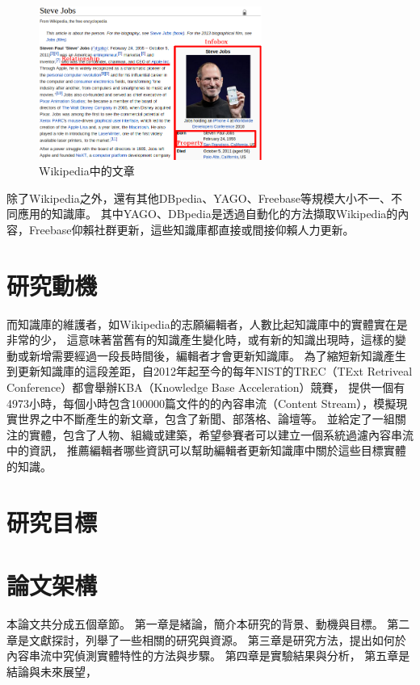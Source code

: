 \begin{figure}
\centering
\includegraphics[width=0.65\textwidth]{images/01-wiki-as-kb}
\caption{Wikipedia中的文章}
\label{i:wiki}
\end{figure}

除了Wikipedia之外，還有其他DBpedia\cite{dbpedia-swj}、YAGO\cite{suchanek2007WWW}、Freebase\cite{freebase}等規模大小不一、不同應用的知識庫。
其中YAGO、DBpedia是透過自動化的方法擷取Wikipedia的內容，Freebase仰賴社群更新，這些知識庫都直接或間接仰賴人力更新。

%
%
\section{研究動機}
而知識庫的維護者，如Wikipedia的志願編輯者，人數比起知識庫中的實體實在是非常的少，
這意味著當舊有的知識產生變化時，或有新的知識出現時，這樣的變動或新增需要經過一段長時間後，編輯者才會更新知識庫。
為了縮短新知識產生到更新知識庫的這段差距，自2012年起至今的每年NIST的TREC（TExt Retriveal Conference）都會舉辦KBA（Knowledge Base Acceleration）競賽，
提供一個有4973小時，每個小時包含100000篇文件的的內容串流（Content Stream），模擬現實世界之中不斷產生的新文章，包含了新聞、部落格、論壇等。
並給定了一組關注的實體，包含了人物、組織或建築，希望參賽者可以建立一個系統過濾內容串流中的資訊，
推薦編輯者哪些資訊可以幫助編輯者更新知識庫中關於這些目標實體的知識。




%
%
\section{研究目標}

%
%
\section{論文架構}  %
本論文共分成五個章節。
第一章是緒論，簡介本研究的背景、動機與目標。
第二章是文獻探討，列舉了一些相關的研究與資源。
第三章是研究方法，提出如何於內容串流中究偵測實體特性的方法與步驟。
第四章是實驗結果與分析，
第五章是結論與未來展望，

